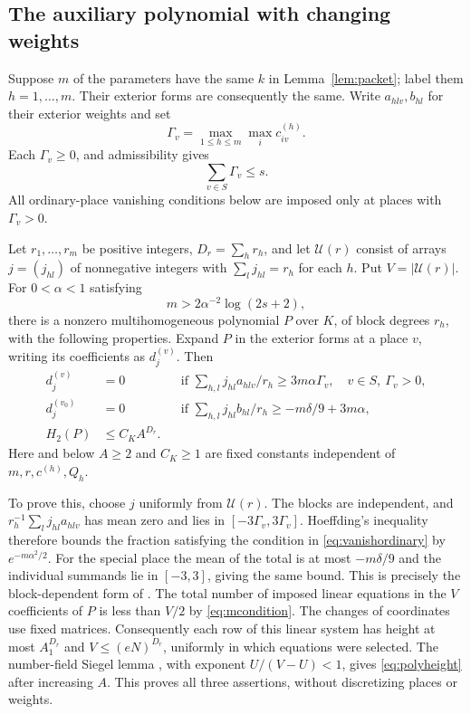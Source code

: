 \documentclass[11pt]{article}
\numberwithin{equation}{section}
\theoremstyle{remark}\newtheorem{remark}[theorem]{Remark}
\begin{document}
\subsection{The auxiliary polynomial with changing weights}
Suppose $m$ of the parameters have the same $k$ in
Lemma~\ref{lem:packet}; label them $h=1,\ldots,m$.
Their exterior forms are consequently the same.
Write $a_{hlv},b_{hl}$ for their exterior weights and set
\begin{equation}\label{eq:Gamma}
 \Gamma_v=\max_{1\le h\le m}\max_i c^{(h)}_{iv}.
\end{equation}
Each $\Gamma_v\ge0$, and admissibility gives
\begin{equation}\label{eq:Gammasum}
 \sum_{v\in S}\Gamma_v\le s.
\end{equation}
All ordinary-place vanishing conditions below are imposed only at
places with $\Gamma_v>0$.

Let $r_1,\ldots,r_m$ be positive integers, $D_r=\sum_h r_h$, and let
$\mathcal U(r)$ consist of arrays $j=(j_{hl})$ of nonnegative integers
with $\sum_l j_{hl}=r_h$ for each $h$. Put $V=|\mathcal U(r)|$.
For $0<\alpha<1$ satisfying
\begin{equation}\label{eq:mcondition}
 m>2\alpha^{-2}\log(2s+2),
\end{equation}
there is a nonzero multihomogeneous polynomial $P$ over $K$, of block
degrees $r_h$, with the following properties. Expand $P$ in the exterior
forms at a place $v$, writing its coefficients as $d^{(v)}_j$.
Then
\begin{align}
 d^{(v)}_j&=0 &&\text{if }\sum_{h,l}j_{hl}a_{hlv}/r_h\ge3m\alpha\Gamma_v,
       \quad v\in S,\ \Gamma_v>0,\label{eq:vanishordinary}\\
 d^{(v_0)}_j&=0 &&\text{if }\sum_{h,l}j_{hl}b_{hl}/r_h\ge-m\delta/9+3m\alpha,
       \label{eq:vanishspecial}\\
 H_2(P)&\le C_K A^{D_r}.&&\label{eq:polyheight}
\end{align}
Here and below $A\ge2$ and $C_K\ge1$ are fixed constants independent of
$m,r,c^{(h)},Q_h$.

To prove this, choose $j$ uniformly from $\mathcal U(r)$. The blocks are
independent, and
$r_h^{-1}\sum_l j_{hl}a_{hlv}$ has mean zero and lies in
$[-3\Gamma_v,3\Gamma_v]$.
Hoeffding's inequality therefore bounds the fraction satisfying the
condition in \eqref{eq:vanishordinary} by $e^{-m\alpha^2/2}$.
For the special place the mean of the total is at most $-m\delta/9$
and the individual summands lie in $[-3,3]$, giving the same bound.
This is precisely the block-dependent form of
\cite[Lemma~13.3]{EF13}.
The total number of imposed linear equations in the $V$ coefficients
of $P$ is less than $V/2$ by \eqref{eq:mcondition}.
The changes of coordinates use fixed matrices. Consequently each row
of this linear system has height at most $A_1^{D_r}$ and
$V\le(eN)^{D_r}$, uniformly in which equations were selected.
The number-field Siegel lemma \cite[Lemma~13.1]{EF13}, with exponent
$U/(V-U)<1$, gives \eqref{eq:polyheight} after increasing $A$.
This proves all three assertions, without discretizing places or weights.
\end{document}
